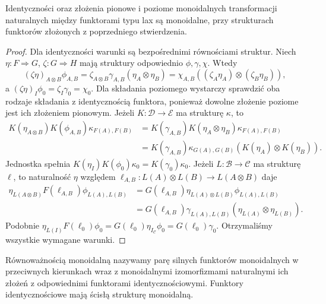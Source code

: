 \begin{stwierdzenie}\label{cat:prop:monoidal-transform-composition}
Identyczności oraz złożenia pionowe i poziome monoidalnych transformacji naturalnych między funktorami typu lax są monoidalne, przy strukturach funktorów złożonych z poprzedniego stwierdzenia.
\end{stwierdzenie}
\begin{proof}
Dla identyczności warunki są bezpośrednimi równościami struktur. Niech $\eta:F\Rightarrow G$, $\zeta:G\Rightarrow H$ mają struktury odpowiednio $\phi,\gamma,\chi$. Wtedy
\[
(\zeta\eta)_{A\otimes B}\phi_{A,B}
=\zeta_{A\otimes B}\gamma_{A,B}(\eta_A\otimes\eta_B)
=\chi_{A,B}((\zeta_A\eta_A)\otimes(\zeta_B\eta_B)),
\]
a $(\zeta\eta)_I\phi_0=\zeta_I\gamma_0=\chi_0$.
Dla składania poziomego wystarczy sprawdzić oba rodzaje składania z identycznością funktora, ponieważ dowolne złożenie poziome jest ich złożeniem pionowym.
Jeżeli $K:\mathcal D\to\mathcal E$ ma strukturę $\kappa$, to
\[
\begin{aligned}
K(\eta_{A\otimes B})K(\phi_{A,B})\kappa_{F(A),F(B)}
&=K(\gamma_{A,B})K(\eta_A\otimes\eta_B)\kappa_{F(A),F(B)}\\
&=K(\gamma_{A,B})\kappa_{G(A),G(B)}(K(\eta_A)\otimes K(\eta_B)).
\end{aligned}
\]
Jednostka spełnia $K(\eta_I)K(\phi_0)\kappa_0=K(\gamma_0)\kappa_0$.
Jeżeli $L:\mathcal B\to\mathcal C$ ma strukturę $\ell$, to naturalność $\eta$ względem $\ell_{A,B}:L(A)\otimes L(B)\to L(A\otimes B)$ daje
\[
\begin{aligned}
\eta_{L(A\otimes B)}F(\ell_{A,B})\phi_{L(A),L(B)}
&=G(\ell_{A,B})\eta_{L(A)\otimes L(B)}\phi_{L(A),L(B)}\\
&=G(\ell_{A,B})\gamma_{L(A),L(B)}(\eta_{L(A)}\otimes\eta_{L(B)}).
\end{aligned}
\]
Podobnie $\eta_{L(I)}F(\ell_0)\phi_0=G(\ell_0)\eta_{I_{\mathcal C}}\phi_0=G(\ell_0)\gamma_0$.
Otrzymaliśmy wszystkie wymagane warunki.
\end{proof}

\begin{definicja}\label{cat:def:monoidal-equivalence}
Równoważnością monoidalną nazywamy parę silnych funktorów monoidalnych w przeciwnych kierunkach wraz z monoidalnymi izomorfizmami naturalnymi ich złożeń z odpowiednimi funktorami identycznościowymi. Funktory identycznościowe mają ścisłą strukturę monoidalną.
\end{definicja}

